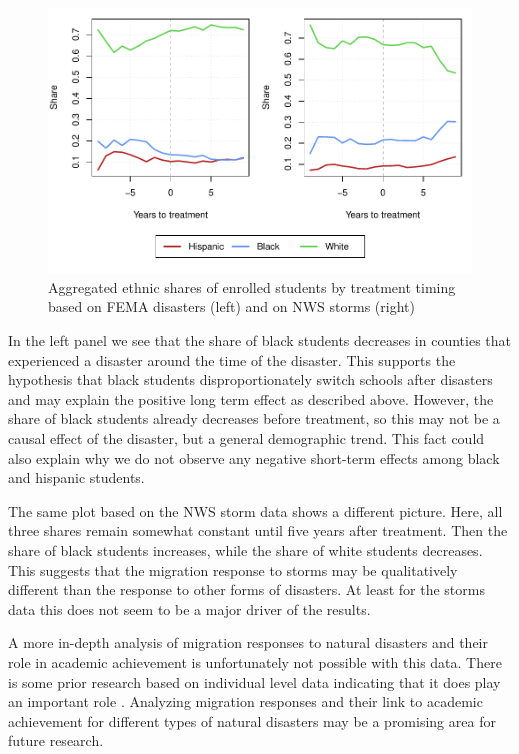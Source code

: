 \begin{figure}[!h]
	\centering
	\includegraphics[scale=1]{"../Code & Data/EthnicComposition.pdf"}
	\caption{Aggregated ethnic shares of enrolled students by treatment timing based on FEMA disasters (left) and on NWS storms (right)}
	\label{EthnicComposition}
\end{figure}

In the left panel we see that the share of black students decreases in counties that experienced a disaster around the time of the disaster. This supports the hypothesis that black students disproportionately switch schools after disasters and may explain the positive long term effect as described above. However, the share of black students already decreases before treatment, so this may not be a causal effect of the disaster, but a general demographic trend. This fact could also explain why we do not observe any negative short-term effects among black and hispanic students.

The same plot based on the NWS storm data shows a different picture. Here, all three shares remain somewhat constant until five years after treatment. Then the share of black students increases, while the share of white students decreases. This suggests that the migration response to storms may be qualitatively different than the response to other forms of disasters. At least for the storms data this does not seem to be a major driver of the results.

A more in-depth analysis of migration responses to natural disasters and their role in academic achievement is unfortunately not possible with this data. There is some prior research based on individual level data indicating that it does play an important role \citep[for example][]{Sacerdote_2012}. Analyzing migration responses and their link to academic achievement for different types of natural disasters may be a promising area for future research.

